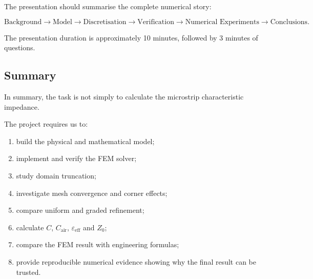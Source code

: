 The presentation should summarise the complete numerical story:

\[
\text{Background}
\rightarrow
\text{Model}
\rightarrow
\text{Discretisation}
\rightarrow
\text{Verification}
\rightarrow
\text{Numerical Experiments}
\rightarrow
\text{Conclusions}.
\]

The presentation duration is approximately 10 minutes, followed by 3 minutes of questions.

\subsection*{Summary}

In summary, the task is not simply to calculate the microstrip characteristic impedance.

The project requires us to:

\begin{enumerate}
    \item build the physical and mathematical model;
    \item implement and verify the FEM solver;
    \item study domain truncation;
    \item investigate mesh convergence and corner effects;
    \item compare uniform and graded refinement;
    \item calculate \(C\), \(C_{\mathrm{air}}\), \(\varepsilon_{\mathrm{eff}}\) and \(Z_0\);
    \item compare the FEM result with engineering formulas;
    \item provide reproducible numerical evidence showing why the final result can be trusted.
\end{enumerate}
